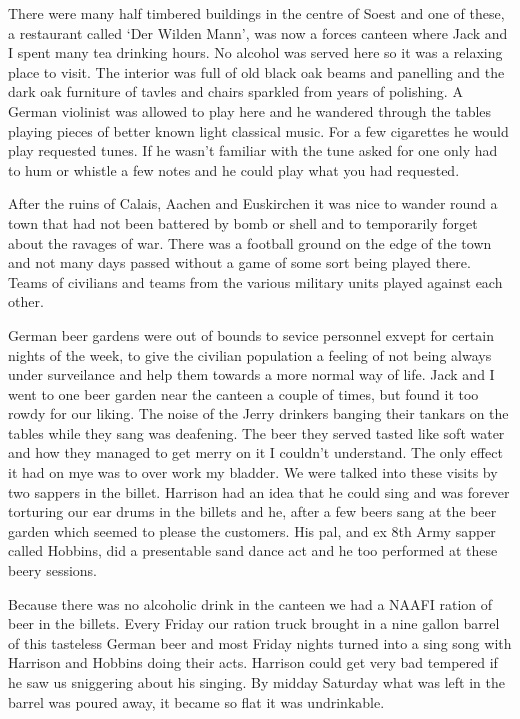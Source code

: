 There were many half timbered buildings in the centre of Soest and one
of these, a restaurant called `Der Wilden Mann', was now a forces
canteen where Jack and I spent many tea drinking hours. No alcohol was
served here so it was a relaxing place to visit. The interior was full
of old black oak beams and panelling and the dark oak furniture of
tavles and chairs sparkled from years of polishing. A German violinist
was allowed to play here and he wandered through the tables playing
pieces of better known light classical music. For a few cigarettes he
would play requested tunes. If he wasn't familiar with the tune asked
for one only had to hum or whistle a few notes and he could play what
you had requested.

After the ruins of Calais, Aachen and Euskirchen it was nice to wander
round a town that had not been battered by bomb or shell and to
temporarily forget about the ravages of war. There was a football
ground on the edge of the town and not many days passed without a game
of some sort being played there. Teams of civilians and teams from the
various military units played against each other.

German beer gardens were out of bounds to sevice personnel exvept for
certain nights of the week, to give the civilian population a feeling
of not being always under surveilance and help them towards a more
normal way of life. Jack and I went to one beer garden near the
canteen a couple of times, but found it too rowdy for our liking. The
noise of the Jerry drinkers banging their tankars on the tables while
they sang was deafening. The beer they served tasted like soft water
and how they managed to get merry on it I couldn't understand. The
only effect it had on mye was to over work my bladder. We were talked
into these visits by two sappers in the billet. \Sapper Harrison had an
idea that he could sing and was forever torturing our ear drums in the
billets and he, after a few beers sang at the beer garden which seemed
to please the customers. His pal, and ex 8th Army sapper called
Hobbins, did a presentable sand dance act and he too performed at
these beery sessions.

Because there was no alcoholic drink in the canteen we had a NAAFI
ration of beer in the billets. Every Friday our ration truck brought
in a nine gallon barrel of this tasteless German beer and most Friday
nights turned into a sing song with Harrison and Hobbins doing their
acts. Harrison could get very bad tempered if he saw us sniggering
about his singing. By midday Saturday what was left in the barrel was
poured away, it became so flat it was undrinkable.

